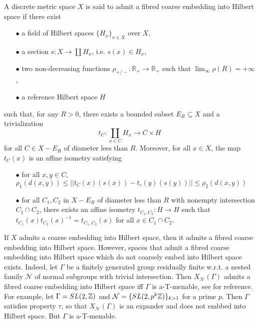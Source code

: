 \begin{definition} A discrete metric space $X$ is said to admit a fibred coarse embedding into Hilbert space if there exist
\begin{itemize}
\item[$\bullet$] a field of Hilbert spaces $\{H_x\}_{x\in X}$ over $X$,
\item[$\bullet$] a section $s : X\rightarrow \coprod H_x$, i.e. $s(x)\in H_x$,
\item[$\bullet$] two non-decreasing functions $\rho_{+/-}: \mathbb R_+\rightarrow \mathbb R_+$ such that $\lim_{\infty} \rho(R) = +\infty$,
\item[$\bullet$] a reference Hilbert space $H$
\end{itemize}
such that, for any $R>0$, there exists a bounded subset $E_R\subseteq X$ and a trivialization 
\[t_C : \coprod_{x\in C} H_x \rightarrow C\times H\]
for all $C\in X - E_R$ of diameter less than $R$. Moreover, for all $x\in X$, the map $t_C(x)$ is an affine isometry satisfying 
\begin{itemize}
\item[$\bullet$] for all $x,y\in C$, $\rho_1(d(x,y))\leq ||t_C(x)(s(x))-t_c(y)(s(y))|| \leq \rho_2(d(x,y))$
\item[$\bullet$] for all $C_1,C_2$ in $X - E_R$ of diameter less than $R$ with nonempty intersection $C_1\cap C_2$, there exists an affine isometry $t_{C_1,C_2} : H\rightarrow H $ such that $t_{C_1}(x)t_{C_2}(x)^{-1} = t_{C_1,C_2}(x)$ for all $x\in C_1\cap C_2$.
\end{itemize}
\end{definition}

\begin{rk} If $X$ admits a coarse embedding into Hilbert space, then it admits a fibred coarse embedding into Hilbert space. However, spaces that admit a fibred coarse embedding into Hilbert space which do not coarsely embed into Hilbert space exists. Indeed, let $\Gamma$ be a finitely generated group residually finite w.r.t. a nested family $\mathcal N$ of normal subgroups with trivial intersection. Then $X_{\mathcal N}(\Gamma)$ admits a fibred coarse embedding into Hilbert space iff $\Gamma$ is a-T-menable, see \cite{FinnSellFibred} for reference. For example, let $\Gamma = SL(2,\mathbb Z)$ and $\mathcal N= \{SL(2,p^k\mathbb Z)\}_{k>1}$ for a prime $p$. Then $\Gamma$ satisfies property $\tau$, so that $X_{\mathcal N}(\Gamma)$ is an expander and does not embbed into Hilbert space. But $\Gamma$ is a-T-menable.
\end{rk}

